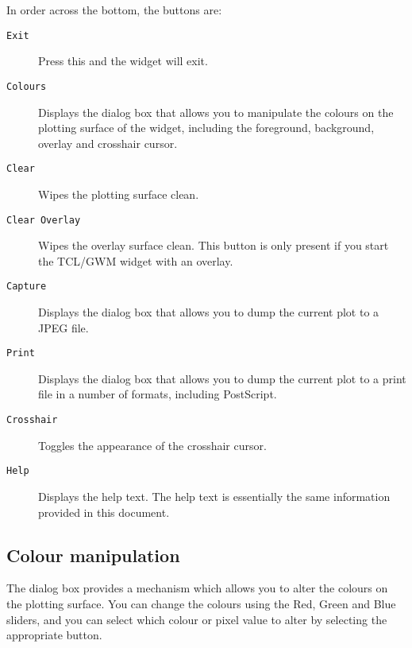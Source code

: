 In order across the bottom, the buttons are:

\begin{description}

\item[{\tt{Exit}}] Press this and the widget will exit.

\item[{\tt{Colours}}] Displays the {} dialog box that
allows you to manipulate the colours on the plotting surface of the
widget, including the foreground, background, overlay and crosshair
cursor.

\item[{\tt{Clear}}] Wipes the plotting surface clean.

\item[{\tt{Clear Overlay}}] Wipes the overlay surface clean.  This button is
only present if you start the TCL/GWM widget with an overlay.

\item[{\tt{Capture}}] Displays the {} dialog box that
allows you to dump the current plot to a JPEG file.

\item[{\tt{Print}}] Displays the {} dialog box that
allows you to dump the current plot to a print file in a number of
formats, including PostScript.

\item[{\tt{Crosshair}}] Toggles the appearance of the crosshair cursor.

\item[{\tt{Help}}] Displays the help text.  The help text is
essentially the same information provided in this document.

\end{description}

\subsection{\label{colour_manipulation}Colour manipulation}

The {} dialog box provides a mechanism which allows you to
alter the colours on the plotting surface.  You can change the colours
using the Red, Green and Blue sliders, and you can select which
colour or pixel value to alter by selecting the appropriate button.

